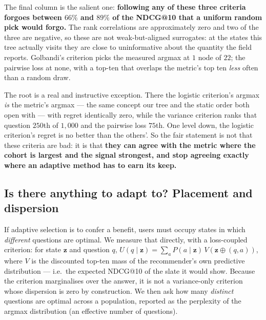 \documentclass[11pt]{article}
\newcommand{\zz}{\mathbf{z}}
\begin{document}
The final column is the salient one: \textbf{following any of these three criteria forgoes between
$66\%$ and $89\%$ of the NDCG@10 that a uniform random pick would forgo.} The rank correlations are
approximately zero and two of the three are negative, so these are not weak-but-aligned surrogates:
at the states this tree actually visits they are close to uninformative about the quantity the field
reports. Golbandi's criterion picks the measured argmax at $1$ node of $22$; the pairwise loss at
none, with a top-ten that overlaps the metric's top ten \emph{less} often than a random draw.

The root is a real and instructive exception. There the logistic criterion's argmax \emph{is} the
metric's argmax --- the same concept our tree and the static order both open with --- with regret
identically zero, while the variance criterion ranks that question $250$th of $1{,}000$ and the
pairwise loss $75$th. One level down, the logistic criterion's regret is no better than the others'.
So the fair statement is not that these criteria are bad: it is that \textbf{they can agree with the
metric where the cohort is largest and the signal strongest, and stop agreeing exactly where an
adaptive method has to earn its keep.}

\subsection{Is there anything to adapt to? Placement and dispersion}

If adaptive selection is to confer a benefit, users must occupy states in which \emph{different} questions are
optimal. We measure that directly, with a loss-coupled criterion: for state $\zz$ and question $q$,
$U(q\mid \zz)=\sum_a P(a\mid \zz)\,V(\zz\oplus(q,a))$, where $V$ is the discounted top-ten mass of
the recommender's own predictive distribution --- i.e.\ the expected NDCG@10 of the slate it would
show. Because the criterion marginalises over the answer, it is not a variance-only criterion whose
dispersion is zero by construction. We then ask how many \emph{distinct} questions are optimal
across a population, reported as the perplexity of the argmax distribution (an effective number of
questions).
\end{document}

